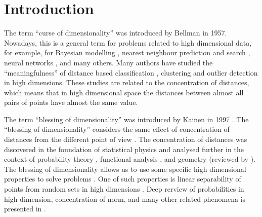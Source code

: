 \documentclass[entropy,article,submit,moreauthors,pdftex]{Definitions/mdpi}
\begin{document}


\section{Introduction}
The term ``curse of dimensionality'' was introduced by Bellman \cite{bellman1961} in 1957. Nowadays, this is a general term for problems related to high dimensional data, for example, for Bayesian modelling \cite{bishop2006}, nearest neighbour prediction \cite{hastie2009} and search \cite{korn2001}, neural networks \cite{bishop1995}, and many others. Many authors have studied the ``meaningfulness'' of distance based classification \cite{beyer1999, hinneburg2000,  radovanovic2010}, clustering \cite{hinneburg2000, aggarwal2001} and outlier detection \cite{aggarwal2001outlier, radovanovic2010}  in high dimensions. These studies are related to the concentration of distances, which means that in high dimensional space the distances between almost all pairs of points have almost the same value.

The term ``blessing of dimensionality'' was introduced by Kainen in 1997 \cite{kainen1997utilizing}. The ``blessing of dimensionality'' considers the same effect of concentration of distances from the different point of view \cite{chen2013, gorban2016, liu2017}.
The concentration of distances was discovered in the foundation of statistical physics and analysed further in the context of probability theory \cite{vershynin2018high, gorban2020high}, functional analysis \cite{rayon2003isoperimetry}, and  geometry (reviewed by \cite{GIANNOPOULOS2000, gorban2018, ledoux2001}). The blessing of dimensionality allows us to use some specific high dimensional properties to solve problems \cite{donoho2000high, anderson2014more}. One of such properties is linear separability of points from random sets in high dimensions \cite{gorban2018, gorban2018correction}. Deep rerview of probabilities in high dimension, concentration of norm, and many other related phenomena is presented in \cite{vershynin2018high}.
\end{document}
